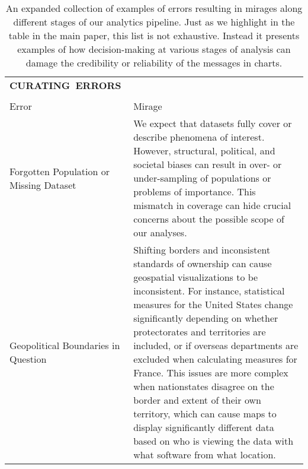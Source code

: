 
  \begin{longtable}{>{\raggedright\arraybackslash}p{3cm}p{14cm}}
    \caption{An expanded collection of examples of errors resulting in mirages along different stages of our analytics pipeline. Just as we highlight in the table in the main paper, this list is not exhaustive. Instead it presents examples of how decision-making at various stages of analysis can damage the credibility or reliability of the messages in charts.}

    
  \\\hbox{\normalsize{\textbf{CURATING ERRORS}}}&\\ \\
  \normalsize{Error} & \normalsize{Mirage}\\ \hline
   \rowcolor{colora}Forgotten Population or Missing Dataset  & We expect that datasets fully cover or describe phenomena of interest. However, structural, political, and societal biases can result in over- or under-sampling of populations or problems of importance. This mismatch in coverage can hide crucial concerns about the possible scope of our analyses. \cite{missingdatasets, dignazio2019draft}\\
 \rowcolor{colora-opaque}Geopolitical Boundaries in Question  & Shifting borders and inconsistent standards of ownership can cause geospatial visualizations to be inconsistent. For instance, statistical measures for the United States change significantly depending on whether protectorates and territories are included, or if overseas departments are excluded when calculating measures for France. This issues are more complex when nationstates disagree on the border and extent of their own territory, which can cause maps to display significantly different data based on who is viewing the data with what software from what location. \cite{missingdatasets,soeller2016mapwatch}\\
  


\end{longtable}
